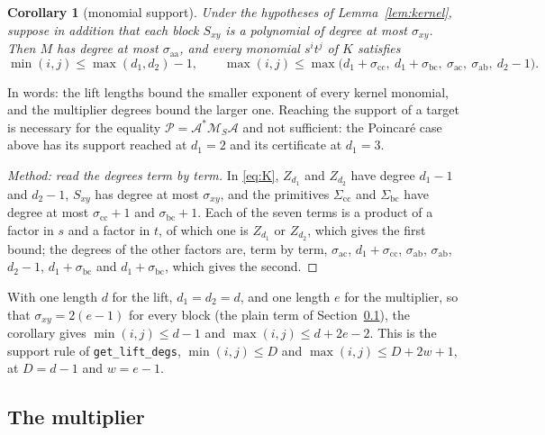 \documentclass[12pt]{article}
\newcommand{\mcl}[1]{\mathcal{#1}}
\newcommand{\code}[1]{\texttt{#1}}
\newcommand{\ba}{\mathrm{a}}
\newcommand{\bb}{\mathrm{b}}
\newcommand{\bc}{\mathrm{c}}
\theoremstyle{plain}
\newtheorem{corollary}[theorem]{Corollary}
\theoremstyle{definition}
\theoremstyle{remark}
\begin{document}
\begin{corollary}[monomial support]\label{cor:support}
Under the hypotheses of Lemma~\ref{lem:kernel}, suppose in addition that each block $S_{xy}$ is a polynomial of degree at most $\sigma_{xy}$. Then $M$ has degree at most $\sigma_{\ba\ba}$, and every monomial $s^it^j$ of $K$ satisfies
\[
\min(i,j)\le\max(d_1,d_2)-1,\qquad \max(i,j)\le\max\bigl(d_1+\sigma_{\bc\bc},\ d_1+\sigma_{\bb\bc},\ \sigma_{\ba\bc},\ \sigma_{\ba\bb},\ d_2-1\bigr).
\]
\end{corollary}
In words: the lift lengths bound the smaller exponent of every kernel monomial, and the multiplier degrees bound the larger one. Reaching the support of a target is necessary for the equality $\mcl P=\mcl A^*\mcl M_S\mcl A$ and not sufficient: the Poincar\'e case above has its support reached at $d_1=2$ and its certificate at $d_1=3$.

\begin{proof}[Method: read the degrees term by term]
In \eqref{eq:K}, $Z_{d_1}$ and $Z_{d_2}$ have degree $d_1-1$ and $d_2-1$, $S_{xy}$ has degree at most $\sigma_{xy}$, and the primitives $\Sigma_{\bc\bc}$ and $\Sigma_{\bb\bc}$ have degree at most $\sigma_{\bc\bc}+1$ and $\sigma_{\bb\bc}+1$. Each of the seven terms is a product of a factor in $s$ and a factor in $t$, of which one is $Z_{d_1}$ or $Z_{d_2}$, which gives the first bound; the degrees of the other factors are, term by term, $\sigma_{\ba\bc}$, $d_1+\sigma_{\bc\bc}$, $\sigma_{\ba\bb}$, $\sigma_{\ba\bb}$, $d_2-1$, $d_1+\sigma_{\bb\bc}$ and $d_1+\sigma_{\bb\bc}$, which gives the second.
\end{proof}

With one length $d$ for the lift, $d_1=d_2=d$, and one length $e$ for the multiplier, so that $\sigma_{xy}=2(e-1)$ for every block (the plain term of Section~\ref{sec:mult}), the corollary gives $\min(i,j)\le d-1$ and $\max(i,j)\le d+2e-2$. This is the support rule of \code{get\_lift\_degs}, $\min(i,j)\le D$ and $\max(i,j)\le D+2w+1$, at $D=d-1$ and $w=e-1$.

\subsection{The multiplier}\label{sec:mult}
\end{document}
